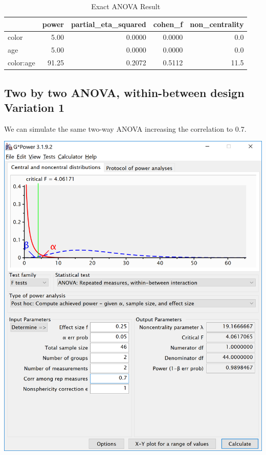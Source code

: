 \documentclass[]{book}
\begin{document}
\begin{table}[t]

\caption{\label{tab:unnamed-chunk-100}Exact ANOVA Result}
\centering
\begin{tabular}{l|r|r|r|r}
\hline
  & power & partial\_eta\_squared & cohen\_f & non\_centrality\\
\hline
color & 5.00 & 0.0000 & 0.0000 & 0.0\\
\hline
age & 5.00 & 0.0000 & 0.0000 & 0.0\\
\hline
color:age & 91.25 & 0.2072 & 0.5112 & 11.5\\
\hline
\end{tabular}
\end{table}

\hypertarget{two-by-two-anova-within-between-design-variation-1}{%
\subsection{Two by two ANOVA, within-between design Variation 1}\label{two-by-two-anova-within-between-design-variation-1}}

We can simulate the same two-way ANOVA increasing the correlation to 0.7.

\includegraphics{screenshots/gpower_6.png}
\end{document}
